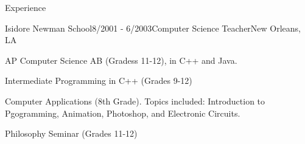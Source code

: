 \documentclass{resume} %
\begin{document}
\begin{rSection}{Experience}
\begin{rSubsection}{Isidore Newman School}{8/2001 - 6/2003}{Computer Science Teacher}{New Orleans, LA}
\item AP Computer Science AB (Gradess 11-12), in C++ and Java.
\item Intermediate Programming in C++ (Grades 9-12)
\item Computer Applications (8th Grade). Topics included: Introduction to Pgogramming, Animation, Photoshop, and Electronic Circuits.
\item Philosophy Seminar (Grades 11-12)
\end{rSubsection}

\end{rSection}






\end{document}
